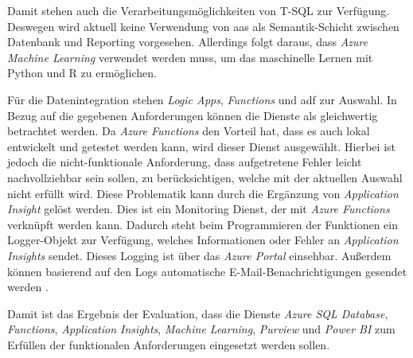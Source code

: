 Damit stehen auch die Verarbeitungsmöglichkeiten von T-SQL zur Verfügung. Deswegen wird aktuell keine Verwendung von \ac{aas} als Semantik-Schicht zwischen Datenbank und Reporting vorgesehen. Allerdings folgt daraus, dass \textit{Azure Machine Learning} verwendet werden muss, um das maschinelle Lernen mit Python und R zu ermöglichen.

Für die Datenintegration stehen \textit{Logic Apps}, \textit{Functions} und \ac{adf} zur Auswahl. In Bezug auf die gegebenen Anforderungen können die Dienste als gleichwertig betrachtet werden. Da \textit{Azure Functions} den Vorteil hat, dass es auch lokal entwickelt und getestet werden kann, wird dieser Dienst ausgewählt. Hierbei ist jedoch die nicht-funktionale Anforderung, dass aufgetretene Fehler leicht nachvollziehbar sein sollen, zu berücksichtigen, welche mit der aktuellen Auswahl nicht erfüllt wird. Diese Problematik kann durch die Ergänzung von \textit{Application Insight} gelöst werden. Dies ist ein Monitoring Dienst, der mit \textit{Azure Functions} verknüpft werden kann. Dadurch steht beim Programmieren der Funktionen ein Logger-Objekt zur Verfügung, welches Informationen oder Fehler an \textit{Application Insights} sendet. Dieses Logging ist über das \textit{Azure Portal} einsehbar. Außerdem können basierend auf den Logs automatische E-Mail-Benachrichtigungen gesendet werden \cite[vgl.][]{satapathi_hands-azure_2021}.




























Damit ist das Ergebnis der Evaluation, dass die Dienste \textit{Azure SQL Database}, \textit{Functions}, \textit{Application Insights}, \textit{Machine Learning}, \textit{Purview} und \textit{Power BI} zum Erfüllen der funktionalen Anforderungen eingesetzt werden sollen. 




